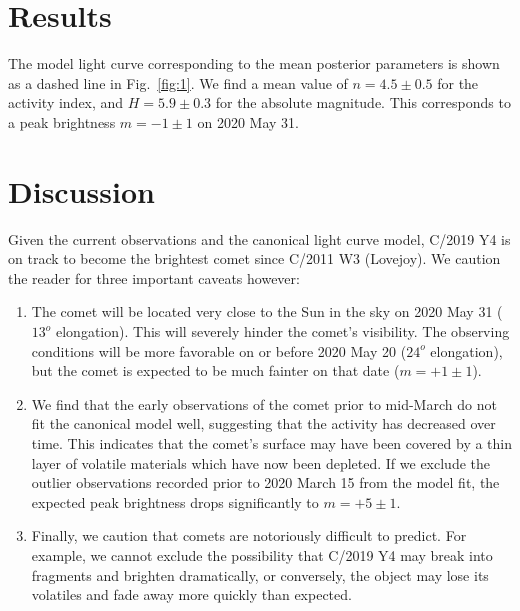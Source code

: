 \documentclass[RNAAS]{aastex63}
\begin{document}
\section{Results}

The model light curve corresponding to the mean posterior parameters is shown as a dashed line in Fig.~\ref{fig:1}.
We find a mean value of $n=4.5\pm0.5$ for the activity index, and $H=5.9\pm0.3$ for the absolute magnitude. This corresponds to a peak brightness $m=-1\pm1$ on 2020 May 31. 


\section{Discussion}

Given the current observations and the canonical light curve model, C/2019 Y4 is on track to become the brightest comet since C/2011 W3 (Lovejoy).
We caution the reader for three important caveats however:
\begin{enumerate}
\item The comet will be located very close to the Sun in the sky on 2020 May 31 ($13^o$ elongation). This will severely hinder the comet's visibility.
The observing conditions will be more favorable on or before 2020 May 20 ($24^o$ elongation), but the comet is expected to be much fainter on that date ($m=+1\pm1$).
\item We find that the early observations of the comet prior to mid-March do not fit the canonical model well, suggesting that the activity has decreased over time.
This indicates that the comet's surface may have been covered by a thin layer of volatile materials which have now been depleted. If we exclude the outlier observations recorded prior to 2020 March 15 from the model fit, the expected peak brightness drops significantly to $m=+5\pm1$.
\item Finally, we caution that comets are notoriously difficult to predict.
For example, we cannot exclude the possibility that C/2019 Y4 may break into fragments and brighten dramatically, or conversely, the object may lose its volatiles and fade away more quickly than expected.
\end{enumerate}


\end{document}
